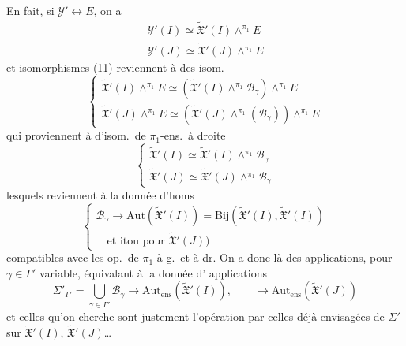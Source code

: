 \documentclass[11pt,a4paper]{article}
\begin{document}
En fait, si $\mathcal{Y}' \longleftrightarrow E$, on a
\[
  \begin{array}{l}
    \mathcal{Y}'(I) \simeq \widetilde{\mathfrak{X}}'(I) \wedge^{\pi_1} E \\
    \mathcal{Y}'(J) \simeq \widetilde{\mathfrak{X}}'(J) \wedge^{\pi_1} E
  \end{array}
\]
et  isomorphismes (11) reviennent à des isom.
\[
  \left\{
  \begin{array}{l}
    \widetilde{\mathfrak{X}}'(I) \wedge^{\pi_1} E \simeq
      (\widetilde{\mathfrak{X}}'(I) \wedge^{\pi_1} \mathcal{B}_{\gamma}) \wedge^{\pi_1} E \\
    \widetilde{\mathfrak{X}}'(J) \wedge^{\pi_1} E \simeq
      (\widetilde{\mathfrak{X}}'(J) \wedge^{\pi_1} (\mathcal{B}_{\gamma})) \wedge^{\pi_1} E
  \end{array}\right.
\]
qui proviennent à  d'isom.\ de $\pi_1$-ens.\ à droite
\[
  \left\{
  \begin{array}{l}
    \widetilde{\mathfrak{X}}'(I) \simeq \widetilde{\mathfrak{X}}'(I) \wedge^{\pi_1} \mathcal{B}_{\gamma} \\
    \widetilde{\mathfrak{X}}'(J) \simeq \widetilde{\mathfrak{X}}'(J) \wedge^{\pi_1} \mathcal{B}_{\gamma}
  \end{array}\right.
\]
lesquels reviennent à la donnée d'homs
\[
  \left\{
  \begin{array}{l}
    \mathcal{B}_{\gamma} \longrightarrow \mathrm{Aut}(\widetilde{\mathfrak{X}}'(I))
      = \mathrm{Bij}(\widetilde{\mathfrak{X}}'(I), \widetilde{\mathfrak{X}}'(I)) \\
    \quad \text{et itou pour } \widetilde{\mathfrak{X}}'(J))
  \end{array}\right.
\]
compatibles avec les op.\ de $\pi_1$ à g.\ et à dr. On a donc là des
applications, pour $\gamma \in \Gamma'$ variable, équivalant \struck{\ill{}} à
la donnée d' applications
\[
  \Sigma'_{\Gamma'} = \bigcup_{\gamma \in \Gamma'} \mathcal{B}_{\gamma}
  \longrightarrow \mathrm{Aut}_{\mathrm{ens}}(\widetilde{\mathfrak{X}}'(I)),
  \qquad \longrightarrow \mathrm{Aut}_{\mathrm{ens}}(\widetilde{\mathfrak{X}}'(J))
\]
et celles qu'on cherche sont justement l'opération  par
celles déjà envisagées de $\Sigma'$ sur $\widetilde{\mathfrak{X}}'(I)$,
$\widetilde{\mathfrak{X}}'(J)$…
\end{document}
